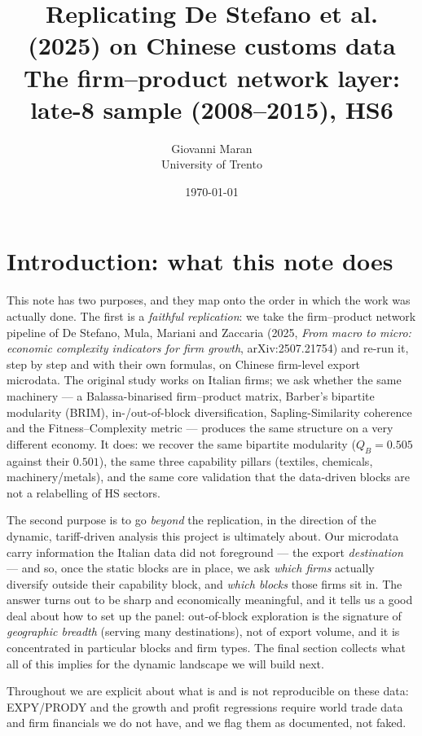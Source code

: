 \documentclass[11pt]{article}
\title{\textbf{Replicating De Stefano et al. (2025) on Chinese customs data}\\[3pt]
\large The firm--product network layer: late-8 sample (2008--2015), HS6}
\author{Giovanni Maran \\ \small University of Trento}
\date{\today}
\newcommand{\QB}{Q_B}
\begin{document}
\maketitle

\setcounter{tocdepth}{1}
\tableofcontents
\bigskip

\section{Introduction: what this note does}

This note has two purposes, and they map onto the order in which the work was actually done. The first is a
\emph{faithful replication}: we take the firm--product network pipeline of De Stefano, Mula, Mariani and
Zaccaria (2025, \emph{From macro to micro: economic complexity indicators for firm growth}, arXiv:2507.21754)
and re-run it, step by step and with their own formulas, on Chinese firm-level export microdata. The original
study works on Italian firms; we ask whether the same machinery --- a Balassa-binarised firm--product matrix,
Barber's bipartite modularity (BRIM), in-/out-of-block diversification, Sapling-Similarity coherence and the
Fitness--Complexity metric --- produces the same structure on a very different economy. It does: we recover the
same bipartite modularity ($\QB=0.505$ against their $0.501$), the same three capability pillars (textiles,
chemicals, machinery/metals), and the same core validation that the data-driven blocks are not a relabelling of
HS sectors.

The second purpose is to go \emph{beyond} the replication, in the direction of the dynamic, tariff-driven
analysis this project is ultimately about. Our microdata carry information the Italian data did not foreground
--- the export \emph{destination} --- and so, once the static blocks are in place, we ask \emph{which firms}
actually diversify outside their capability block, and \emph{which blocks} those firms sit in. The answer turns
out to be sharp and economically meaningful, and it tells us a good deal about how to set up the panel: out-of-block
exploration is the signature of \emph{geographic breadth} (serving many destinations), not of export volume,
and it is concentrated in particular blocks and firm types. The final section collects what all of this implies
for the dynamic landscape we will build next.

Throughout we are explicit about what is and is not reproducible on these data: EXPY/PRODY and the growth and
profit regressions require world trade data and firm financials we do not have, and we flag them as documented,
not faked.
\end{document}
